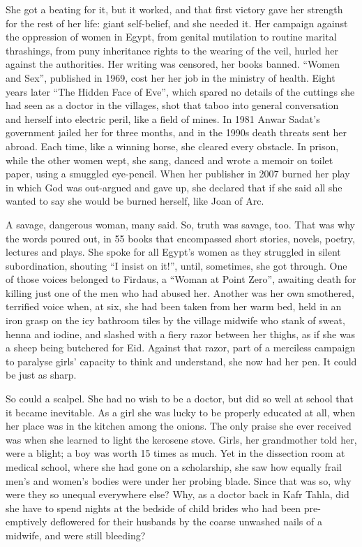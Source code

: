 \documentclass{article}
\begin{document}
She got a beating for it, but it worked, and that first victory gave her strength for the rest of her life: giant self-belief, and she needed it. Her campaign against the oppression of women in Egypt, from genital mutilation to routine marital thrashings, from puny inheritance rights to the wearing of the veil, hurled her against the authorities. Her writing was censored, her books banned. ``Women and Sex'', published in 1969, cost her her job in the ministry of health. Eight years later ``The Hidden Face of Eve'', which spared no details of the cuttings she had seen as a doctor in the villages, shot that taboo into general conversation and herself into electric peril, like a field of mines. In 1981 Anwar Sadat's government jailed her for three months, and in the 1990s death threats sent her abroad. Each time, like a winning horse, she cleared every obstacle. In prison, while the other women wept, she sang, danced and wrote a memoir on toilet paper, using a smuggled eye-pencil. When her publisher in 2007 burned her play in which God was out-argued and gave up, she declared that if she said all she wanted to say she would be burned herself, like Joan of Arc. 

A savage, dangerous woman, many said. So, truth was savage, too. That was why the words poured out, in 55 books that encompassed short stories, novels, poetry, lectures and plays. She spoke for all Egypt's women as they struggled in silent subordination, shouting ``I insist on it!'', until, sometimes, she got through. One of those voices belonged to Firdaus, a ``Woman at Point Zero'', awaiting death for killing just one of the men who had abused her. Another was her own smothered, terrified voice when, at six, she had been taken from her warm bed, held in an iron grasp on the icy bathroom tiles by the village midwife who stank of sweat, henna and iodine, and slashed with a fiery razor between her thighs, as if she was a sheep being butchered for Eid. Against that razor, part of a merciless campaign to paralyse girls' capacity to think and understand, she now had her pen. It could be just as sharp. 

So could a scalpel. She had no wish to be a doctor, but did so well at school that it became inevitable. As a girl she was lucky to be properly educated at all, when her place was in the kitchen among the onions. The only praise she ever received was when she learned to light the kerosene stove. Girls, her grandmother told her, were a blight; a boy was worth 15 times as much. Yet in the dissection room at medical school, where she had gone on a scholarship, she saw how equally frail men's and women's bodies were under her probing blade. Since that was so, why were they so unequal everywhere else? Why, as a doctor back in Kafr Tahla, did she have to spend nights at the bedside of child brides who had been pre-emptively deflowered for their husbands by the coarse unwashed nails of a midwife, and were still bleeding? 
\end{document}
